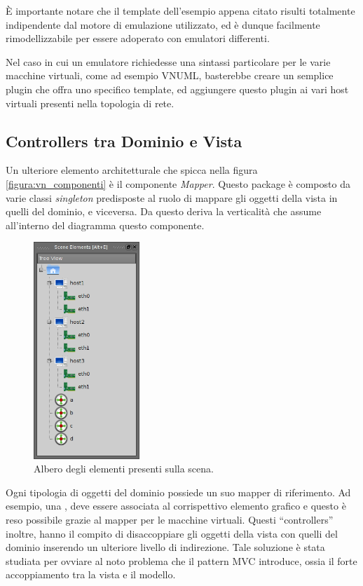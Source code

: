 È importante notare che il template dell'esempio appena citato risulti totalmente indipendente dal motore di emulazione utilizzato, ed è dunque facilmente rimodellizzabile per essere adoperato con emulatori differenti.

Nel caso in cui un emulatore richiedesse una sintassi particolare per le varie macchine virtuali, come ad esempio VNUML, basterebbe creare un semplice plugin che offra uno specifico template, ed aggiungere questo plugin ai vari host virtuali presenti nella topologia di rete.

\subsection{Controllers tra Dominio e Vista}
Un ulteriore elemento architetturale che spicca nella figura \ref{figura:vn_componenti} è il componente \emph{Mapper}. Questo package è composto da varie classi \emph{singleton} predisposte al ruolo di mappare gli oggetti della vista in quelli del dominio, e viceversa. Da questo deriva la verticalità che assume all'interno del diagramma questo componente.

\begin{figure}[!htb]
	\centering
	\includegraphics[width=4cm]{images/visualnetkit_tree_elements.png}
	\caption{Albero degli elementi presenti sulla scena.}
	\label{figura:scene_elements}
\end{figure}

Ogni tipologia di oggetti del dominio possiede un suo mapper di riferimento. Ad esempio, una \virtualmachine{}, deve essere associata al corrispettivo elemento grafico e questo è reso possibile grazie al mapper per le macchine virtuali. Questi ``controllers'' inoltre, hanno il compito di disaccoppiare gli oggetti della vista con quelli del dominio inserendo un ulteriore livello di indirezione. Tale soluzione è stata studiata per ovviare al noto problema che il pattern MVC introduce, ossia il forte accoppiamento tra la vista e il modello.

